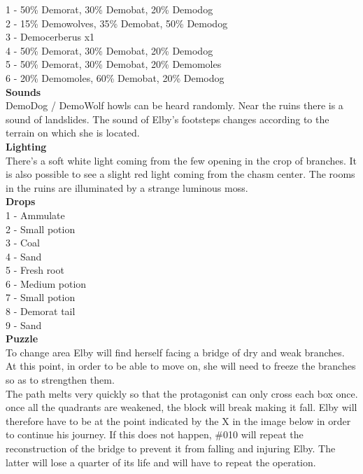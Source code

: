 1 - 50\% Demorat, 30\% Demobat, 20\% Demodog\\
2 - 15\% Demowolves, 35\% Demobat, 50\% Demodog\\
3 - Democerberus x1\\
4 - 50\% Demorat, 30\% Demobat, 20\% Demodog\\
5 - 50\% Demorat, 30\% Demobat, 20\% Demomoles\\
6 - 20\% Demomoles, 60\% Demobat, 20\% Demodog\\

\textbf{Sounds}\\
DemoDog / DemoWolf howls can be heard randomly. Near the ruins there is a sound of landslides. The sound of Elby's footsteps changes according to the terrain on which she is located.\\

\textbf{Lighting}\\
There's a soft white light coming from the few opening in the crop of branches. It is also possible to see a slight red light coming from the chasm center. The rooms in the ruins are illuminated by a strange luminous moss.\\

\textbf{Drops}\\
1 - Ammulate\\
2 - Small potion\\
3 - Coal\\
4 - Sand\\
5 - Fresh root\\
6 - Medium potion\\
7 - Small potion\\
8 - Demorat tail\\
9 - Sand\\

\textbf{Puzzle}\\
To change area Elby will find herself facing a bridge of dry and weak branches. At this point, in order to be able to move on, she will need to freeze the branches so as to strengthen them.\\
The path melts very quickly so that the protagonist can only cross each box once. once all the quadrants are weakened, the block will break making it fall. Elby will therefore have to be at the point indicated by the X in the image below in order to continue his journey. If this does not happen, \#010 will repeat the reconstruction of the bridge to prevent it from falling and injuring Elby. The latter will lose a quarter of its life and will have to repeat the operation.\\

